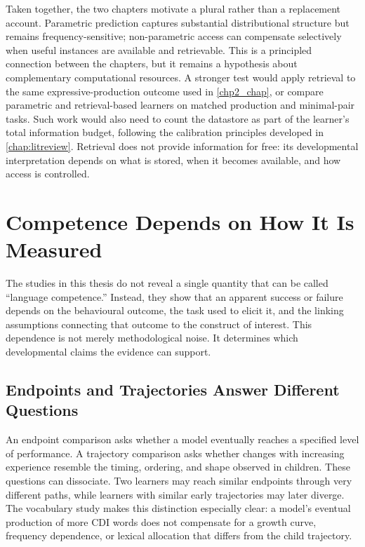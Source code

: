 Taken together, the two chapters motivate a plural rather than a replacement account. Parametric prediction captures substantial distributional structure but remains frequency-sensitive; non-parametric access can compensate selectively when useful instances are available and retrievable. This is a principled connection between the chapters, but it remains a hypothesis about complementary computational resources. A stronger test would apply retrieval to the same expressive-production outcome used in \cref{chp2_chap}, or compare parametric and retrieval-based learners on matched production and minimal-pair tasks. Such work would also need to count the datastore as part of the learner's total information budget, following the calibration principles developed in \cref{chap:litreview}. Retrieval does not provide information for free: its developmental interpretation depends on what is stored, when it becomes available, and how access is controlled.

\section{Competence Depends on How It Is Measured}
\label{sec:gd_measurement}

The studies in this thesis do not reveal a single quantity that can be called ``language competence.'' Instead, they show that an apparent success or failure depends on the behavioural outcome, the task used to elicit it, and the linking assumptions connecting that outcome to the construct of interest. This dependence is not merely methodological noise. It determines which developmental claims the evidence can support.

\subsection{Endpoints and Trajectories Answer Different Questions}

An endpoint comparison asks whether a model eventually reaches a specified level of performance. A trajectory comparison asks whether changes with increasing experience resemble the timing, ordering, and shape observed in children. These questions can dissociate. Two learners may reach similar endpoints through very different paths, while learners with similar early trajectories may later diverge. The vocabulary study makes this distinction especially clear: a model's eventual production of more CDI words does not compensate for a growth curve, frequency dependence, or lexical allocation that differs from the child trajectory.

